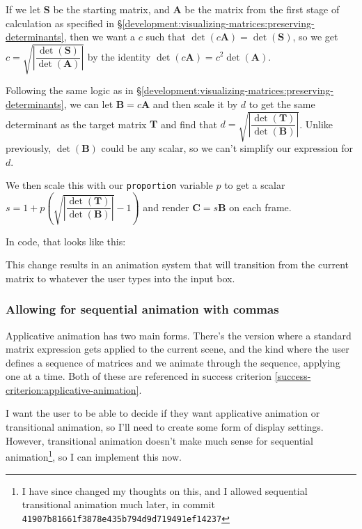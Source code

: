 \documentclass[../development.tex]{subfiles}
\begin{document}
If we let $\mathbf{S}$ be the starting matrix, and $\mathbf{A}$ be the matrix from the first stage of calculation as specified in \S\ref{development:visualizing-matrices:preserving-determinants}, then we want a $c$ such that $\det(c\mathbf{A}) = \det(\mathbf{S})$, so we get $c = \sqrt{\left|\dfrac{\det(\mathbf{S})}{\det(\mathbf{A})}\right|}$ by the identity $\det(c\mathbf{A}) = c^2 \det(\mathbf{A})$.

Following the same logic as in \S\ref{development:visualizing-matrices:preserving-determinants}, we can let $\mathbf{B} = c\mathbf{A}$ and then scale it by $d$ to get the same determinant as the target matrix $\mathbf{T}$ and find that $d = \sqrt{\left|\dfrac{\det(\mathbf{T})}{\det(\mathbf{B})}\right|}$. Unlike previously, $\det(\mathbf{B})$ could be any scalar, so we can't simplify our expression for $d$.

We then scale this with our \texttt{proportion} variable $p$ to get a scalar $s = 1 + p\left(\sqrt{\left|\dfrac{\det(\mathbf{T})}{\det(\mathbf{B})}\right|} - 1\right)$ and render $\mathbf{C} = s\mathbf{B}$ on each frame.

In code, that looks like this:


This change results in an animation system that will transition from the current matrix to whatever the user types into the input box.

\subsubsection{Allowing for sequential animation with commas\label{development:improving-the-gui:allowing-for-sequential-animation-with-commas}}

Applicative animation has two main forms. There's the version where a standard matrix expression gets applied to the current scene, and the kind where the user defines a sequence of matrices and we animate through the sequence, applying one at a time. Both of these are referenced in success criterion \ref{success-criterion:applicative-animation}.

I want the user to be able to decide if they want applicative animation or transitional animation, so I'll need to create some form of display settings. However, transitional animation doesn't make much sense for sequential animation\footnote{I have since changed my thoughts on this, and I allowed sequential transitional animation much later, in commit \texttt{41907b81661f3878e435b794d9d719491ef14237}}, so I can implement this now.
\end{document}
